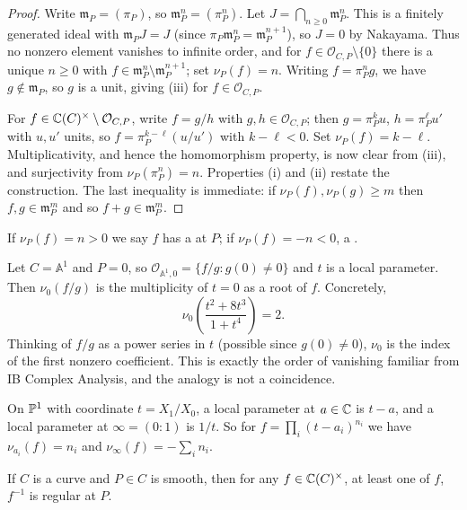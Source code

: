 \documentclass[a4paper]{scrartcl}
\newcommand{\A}{\mathbb{A}}
\newcommand{\mm}{\mathfrak{m}}
\newcommand{\Oh}{\mathcal{O}}
\begin{document}
\begin{proof}
	Write $\mm_P = (\pi_P)$, so $\mm_P^n = (\pi_P^n)$. Let $J = \bigcap_{n\geq 0}\mm_P^n$. This is a finitely generated ideal with $\mm_P J = J$ (since $\pi_P \mm_P^n = \mm_P^{n+1}$), so $J = 0$ by Nakayama. Thus no nonzero element vanishes to infinite order, and for $f \in \Oh_{C,P}\setminus\{0\}$ there is a unique $n \geq 0$ with $f \in \mm_P^n\setminus\mm_P^{n+1}$; set $\nu_P(f) = n$. Writing $f = \pi_P^n g$, we have $g \notin \mm_P$, so $g$ is a unit, giving (iii) for $f \in \Oh_{C,P}$.

	For $f \in \C(C)^\times\setminus\Oh_{C,P}$, write $f = g/h$ with $g,h \in \Oh_{C,P}$; then $g = \pi_P^ku$, $h = \pi_P^\ell u'$ with $u,u'$ units, so $f = \pi_P^{k-\ell}(u/u')$ with $k - \ell < 0$. Set $\nu_P(f) = k - \ell$. Multiplicativity, and hence the homomorphism property, is now clear from (iii), and surjectivity from $\nu_P(\pi_P^n) = n$. Properties (i) and (ii) restate the construction. The last inequality is immediate: if $\nu_P(f),\nu_P(g)\geq m$ then $f,g \in \mm_P^m$ and so $f+g \in \mm_P^m$.
\end{proof}

\begin{definition}
	If $\nu_P(f) = n > 0$ we say $f$ has a  at $P$; if $\nu_P(f) = -n < 0$, a .
\end{definition}

\begin{example}
	Let $C = \A^1$ and $P = 0$, so $\Oh_{\A^1,0} = \{f/g : g(0)\neq 0\}$ and $t$ is a local parameter. Then $\nu_0(f/g)$ is the multiplicity of $t = 0$ as a root of $f$. Concretely,
	$$\nu_0\!\left(\frac{t^2+8t^3}{1+t^4}\right) = 2.$$
	Thinking of $f/g$ as a power series in $t$ (possible since $g(0)\neq 0$), $\nu_0$ is the index of the first nonzero coefficient. This is exactly the order of vanishing familiar from IB Complex Analysis, and the analogy is not a coincidence.
\end{example}

\begin{example}
	On $\mathbb{P}^1$ with coordinate $t = X_1/X_0$, a local parameter at $a \in \mathbb{C}$ is $t - a$, and a local parameter at $\infty = (0:1)$ is $1/t$. So for $f = \prod_i (t-a_i)^{n_i}$ we have $\nu_{a_i}(f) = n_i$ and $\nu_\infty(f) = -\sum_i n_i$.
\end{example}

\begin{corollary}\label{cor:foneover}
	If $C$ is a curve and $P \in C$ is smooth, then for any $f \in \mathbb{C}(C)^\times$, at least one of $f$, $f^{-1}$ is regular at $P$.
\end{corollary}
\end{document}
